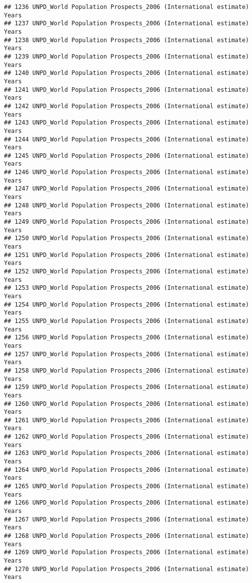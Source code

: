 \documentclass[]{article}
\begin{document}
\begin{verbatim}
## 1236 UNPD_World Population Prospects_2006 (International estimate) Years
## 1237 UNPD_World Population Prospects_2006 (International estimate) Years
## 1238 UNPD_World Population Prospects_2006 (International estimate) Years
## 1239 UNPD_World Population Prospects_2006 (International estimate) Years
## 1240 UNPD_World Population Prospects_2006 (International estimate) Years
## 1241 UNPD_World Population Prospects_2006 (International estimate) Years
## 1242 UNPD_World Population Prospects_2006 (International estimate) Years
## 1243 UNPD_World Population Prospects_2006 (International estimate) Years
## 1244 UNPD_World Population Prospects_2006 (International estimate) Years
## 1245 UNPD_World Population Prospects_2006 (International estimate) Years
## 1246 UNPD_World Population Prospects_2006 (International estimate) Years
## 1247 UNPD_World Population Prospects_2006 (International estimate) Years
## 1248 UNPD_World Population Prospects_2006 (International estimate) Years
## 1249 UNPD_World Population Prospects_2006 (International estimate) Years
## 1250 UNPD_World Population Prospects_2006 (International estimate) Years
## 1251 UNPD_World Population Prospects_2006 (International estimate) Years
## 1252 UNPD_World Population Prospects_2006 (International estimate) Years
## 1253 UNPD_World Population Prospects_2006 (International estimate) Years
## 1254 UNPD_World Population Prospects_2006 (International estimate) Years
## 1255 UNPD_World Population Prospects_2006 (International estimate) Years
## 1256 UNPD_World Population Prospects_2006 (International estimate) Years
## 1257 UNPD_World Population Prospects_2006 (International estimate) Years
## 1258 UNPD_World Population Prospects_2006 (International estimate) Years
## 1259 UNPD_World Population Prospects_2006 (International estimate) Years
## 1260 UNPD_World Population Prospects_2006 (International estimate) Years
## 1261 UNPD_World Population Prospects_2006 (International estimate) Years
## 1262 UNPD_World Population Prospects_2006 (International estimate) Years
## 1263 UNPD_World Population Prospects_2006 (International estimate) Years
## 1264 UNPD_World Population Prospects_2006 (International estimate) Years
## 1265 UNPD_World Population Prospects_2006 (International estimate) Years
## 1266 UNPD_World Population Prospects_2006 (International estimate) Years
## 1267 UNPD_World Population Prospects_2006 (International estimate) Years
## 1268 UNPD_World Population Prospects_2006 (International estimate) Years
## 1269 UNPD_World Population Prospects_2006 (International estimate) Years
## 1270 UNPD_World Population Prospects_2006 (International estimate) Years

\end{verbatim}
\end{document}
